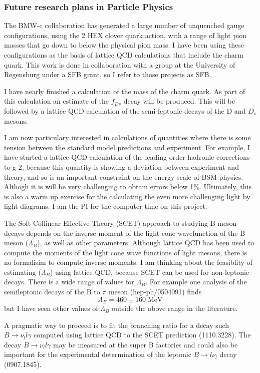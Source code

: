 \subsubsection{Future research plans in Particle Physics}

The BMW-c collaboration has generated a large number
of unquenched gauge configurations, using the 2 HEX clover quark action,
with a range of light pion masses 
that go down to below the physical pion mass.
I have been using these configurations as the basis
of lattice QCD calculations that include the charm quark.
This work is done in collaboration with a group at the
University of Regensburg under a SFB grant, so I
refer to those projects as SFB.

I have nearly finished a calculation of the mass of the 
charm quark. As part of this calculation an 
estimate of the $f_{Ds}$ decay will be produced.
This will be followed
by a lattice QCD calculation of 
the semi-leptonic decays of the D and $D_s$ mesons.

I am now particulary interested in calculations of quantities
where there is some tension between the standard model
predictions and experiment. For example, I have started
a lattice QCD calculation of the leading order hadronic corrections
to g-2, because this quantity is showing a deviation
between experiment and theory, and so
is an important constraint 
on the energy scale of BSM physics. Althogh it is will be very challenging
to obtain  errors below 1\%. Ultimately,
this is also a warm up exercise for the calculating the even more 
challenging light by light diagrams. I am the PI for
the computer time on this project.


The Soft Collinear Effective Theory (SCET)
approach to studying B meson decays depends 
on the inverse moment of the light cone wavefunction
of the B meson ($\Lambda_B$), as well as other 
parameters. Although lattice
QCD has been used to compute the moments of the light cone
wave functions of light mesons, there is no formalisim
to compute inverse moments. I am thinking about the feasiblity
of estimating ($\Lambda_B$) using lattice QCD, because
SCET can be used for non-leptonic decays.
There is a wide range of values for $\Lambda_B$.
For example one analysis of the semileptonic decays
of the B to $\pi$ meson
(hep-ph/0504091) finds 
$$
\Lambda_B = 460 \pm 160 \; \mbox{MeV}
$$
but I have seen other values of $\Lambda_B$ outside the
above range in the literature.

A pragmatic way to proceed is to fit the branching ratio
for a decay such $B \rightarrow \nu_l l \gamma$ 
computed using lattice QCD
to the SCET
prediction (1110.3228). 
The decay $B \rightarrow \nu_l l \gamma$ may be measured at the
super B factories and could also be important for the experimental
determination of the leptonic $B \rightarrow l \nu_l$ decay
(0907.1845).



